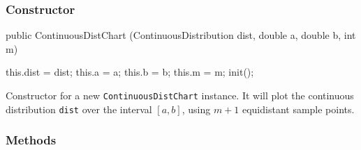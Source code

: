 
\subsubsection*{Constructor}
\begin{code}

   public ContinuousDistChart (ContinuousDistribution dist, double a,
                               double b, int m) \begin{hide} {
      this.dist = dist;
      this.a = a;
      this.b = b;
      this.m = m;
      init();
   }\end{hide}
\end{code}
\begin{tabb}
 Constructor for a new \texttt{ContinuousDistChart} instance. It will plot the
 continuous distribution \texttt{dist} over the interval $[a,b]$,
  using $m+1$ equidistant sample points.
\end{tabb}
\begin{htmlonly}
\end{htmlonly}

\subsubsection*{Methods}

